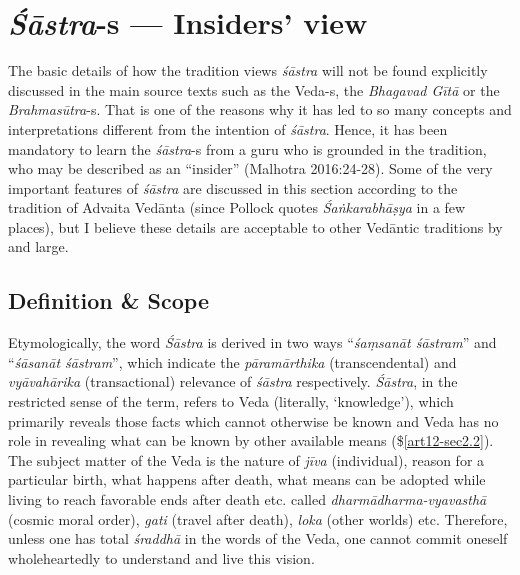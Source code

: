 \section{{{\sl\bfseries Śāstra}\relax}-s --- Insiders' view}\label{art12-sec2}

The basic details of how the tradition views {\sl śāstra} will not be found explicitly discussed in the main source texts such as the Veda-s, the {\sl Bhagavad Gītā} or the {\sl Brahmasūtra}-s. That is one of the reasons why it has led to so many concepts and interpretations different from the intention of {\sl śāstra}. Hence, it has been mandatory to learn the {\sl śāstra}-s from a guru who is grounded in the tradition, who may be described as an ``insider'' (Malhotra 2016:24-28). Some of the very important features of {\sl śāstra} are discussed in this section according to the tradition of Advaita Vedānta (since Pollock quotes {\sl Śaṅkarabhāṣya} in a few places), but I believe these details are acceptable to other Vedāntic traditions by and large.

\subsection{Definition \& Scope}\label{art12-sec2.1}

Etymologically, the word {\sl Śāstra} is derived in two ways ``{\sl śaṃsanāt śāstram}'' and ``{\sl śāsanāt śāstram}'', which indicate the {\sl pāramārthika} (transcendental) and {\sl vyāvahārika} (transactional) relevance of {\sl śāstra} respectively. {\sl Śāstra}, in the restricted sense of the term, refers to Veda (literally, `knowledge'), which primarily reveals those facts which cannot otherwise be known and Veda has no role in revealing what can be known by other available means (\$\ref{art12-sec2.2}). The subject matter of the Veda is the nature of {\sl jīva} (individual), reason for a particular birth, what happens after death, what means can be adopted while living to reach favorable ends after death etc. called {\sl dharmādharma-vyavasthā} (cosmic moral order), {\sl gati} (travel after death), {\sl loka} (other worlds) etc. Therefore, unless one has total {\sl śraddhā} in the words of the Veda, one cannot commit oneself wholeheartedly to understand and live this vision. 

